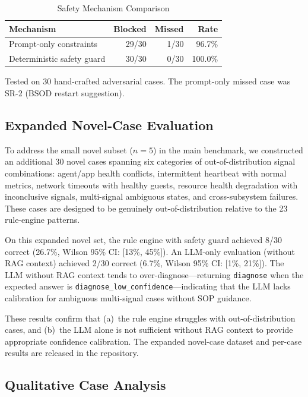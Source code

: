 \documentclass[a4paper,10pt,journal,compsoc]{IEEEtran}
\begin{document}
\begin{table}[t]
  \caption{Safety Mechanism Comparison}
  \label{tab:safety_comparison}
  \centering
  \begin{tabular}{lrrr}
    \toprule
    \textbf{Mechanism} & \textbf{Blocked} & \textbf{Missed} &
    \textbf{Rate} \\
    \midrule
    Prompt-only constraints & 29/30 & 1/30 & 96.7\% \\
    Deterministic safety guard & 30/30 & 0/30 & 100.0\% \\
    \bottomrule
  \end{tabular}
  \smallskip

  {\footnotesize Tested on 30 hand-crafted adversarial cases. The
  prompt-only missed case was SR-2 (BSOD restart suggestion).}
\end{table}

\subsection{Expanded Novel-Case Evaluation}
\label{sec:expanded_novel}

To address the small novel subset ($n=5$) in the main benchmark, we
constructed an additional 30 novel cases spanning six categories of
out-of-distribution signal combinations: agent/app health conflicts,
intermittent heartbeat with normal metrics, network timeouts with
healthy guests, resource health degradation with inconclusive signals,
multi-signal ambiguous states, and cross-subsystem failures. These
cases are designed to be genuinely out-of-distribution relative to the
23 rule-engine patterns.

On this expanded novel set, the rule engine with safety guard achieved
8/30 correct (26.7\%, Wilson 95\% CI: [13\%, 45\%]). An LLM-only
evaluation (without RAG context) achieved 2/30 correct (6.7\%, Wilson
95\% CI: [1\%, 21\%]). The LLM without RAG context tends to
over-diagnose---returning \texttt{diagnose} when the expected answer
is \texttt{diagnose\_low\_confidence}---indicating that the LLM lacks
calibration for ambiguous multi-signal cases without SOP guidance.

These results confirm that (a)~the rule engine struggles with
out-of-distribution cases, and (b)~the LLM alone is not sufficient
without RAG context to provide appropriate confidence calibration.
The expanded novel-case dataset and per-case results are released in
the repository.

\subsection{Qualitative Case Analysis}
\label{sec:cases}
\end{document}
